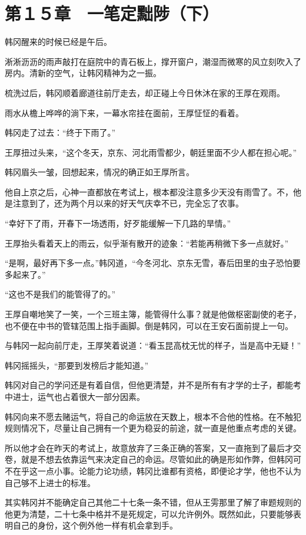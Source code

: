 \section{第１５章　一笔定黜陟（下）}

韩冈醒来的时候已经是午后。

淅淅沥沥的雨声敲打在庭院中的青石板上，撑开窗户，潮湿而微寒的风立刻吹入了房内。清新的空气，让韩冈精神为之一振。

梳洗过后，韩冈顺着廊道往前厅走去，却正碰上今日休沐在家的王厚在观雨。

雨水从檐上哗哗的淌下来，一幕水帘挂在面前，王厚怔怔的看着。

韩冈走了过去：“终于下雨了。”

王厚扭过头来，“这个冬天，京东、河北雨雪都少，朝廷里面不少人都在担心呢。”

韩冈眉头一皱，回想起来，情况的确正如王厚所言。

他自上京之后，心神一直都放在考试上，根本都没注意多少天没有雨雪了。不，他是注意到了，还为两个月以来的好天气庆幸不已，完全忘了农事。

“幸好下了雨，开春下一场透雨，好歹能缓解一下几路的旱情。”

王厚抬头看着天上的雨云，似乎渐有散开的迹象：“若能再稍微下多一点就好。”

“是啊，最好再下多一点。”韩冈道，“今冬河北、京东无雪，春后田里的虫子恐怕要多起来了。”

“这也不是我们的能管得了的。”

王厚自嘲地笑了一笑，一个三班主簿，能管得什么事？就是他做枢密副使的老子，也不便在中书的管辖范围上指手画脚。倒是韩冈，可以在王安石面前提上一句。

与韩冈一起向前厅走，王厚笑着说道：“看玉昆高枕无忧的样子，当是高中无疑！”

韩冈摇摇头，“那要到发榜后才能知道。”

韩冈对自己的学问还是有着自信，但他更清楚，并不是所有有才学的士子，都能考中进士，运气也占着很大一部分因素。

韩冈向来不愿去赌运气，将自己的命运放在天数上，根本不合他的性格。在不触犯规则情况下，尽量让自己拥有一个更为稳妥的前途，就一直是他重点考虑的关键。

所以他才会在昨天的考试上，故意放弃了三条正确的答案，又一直拖到了最后才交卷，就是不想去依靠运气来决定自己的命运。尽管如此的确是形如作弊，但韩冈可不在乎这一点小事。论能力论功绩，韩冈比谁都有资格，即便论才学，他也不认为自己够不上进士的标准。

其实韩冈并不能确定自己其他二十七条一条不错，但从王雱那里了解了审题规则的他更为清楚，二十七条中格并不是死规定，可以允许例外。既然如此，只要能够表明自己的身份，这个例外他一样有机会拿到手。

